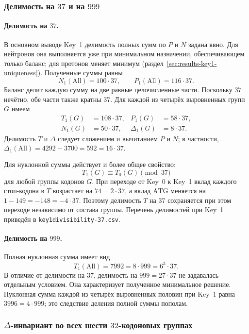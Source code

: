 \documentclass[11pt,a4paper]{article}
\renewcommand{\_}{\origunderscore\allowbreak}
\begin{document}
\subsubsection{Делимость на \texorpdfstring{$37$}{37} и на \texorpdfstring{$999$}{999}}
\label{sec:results-key1-divisibility37and999}

\paragraph{Делимость на $37$.}
В основном выводе Key~1 делимость полных сумм по $P$ и
$N$ задана явно. Для нейтронов она выполняется уже
при минимальном назначении, обеспечивающем только
баланс; для протонов меняет минимум
(раздел~\ref{sec:results-key1-uniqueness}).
Полученные суммы равны
\[
N_1(\mathrm{All})=100\cdot37,\qquad
P_1(\mathrm{All})=116\cdot37.
\]
Баланс делит каждую сумму на две равные целочисленные
части. Поскольку $37$ нечётно, обе части также кратны
$37$. Для каждой из четырёх выровненных групп $G$ имеем
\[
\begin{aligned}
T_1(G)&=108\cdot37, & P_1(G)&=58\cdot37,\\
N_1(G)&=50\cdot37, & \Delta_1(G)&=8\cdot37.
\end{aligned}
\]
Делимость $T$ и $\Delta$ следует сложением и вычитанием
$P$ и $N$; в частности,
$\Delta_1(\mathrm{All})=4292-3700=592=16\cdot37$.

Для нуклонной суммы действует и более общее свойство:
\[
T_1(G)\equiv T_0(G)\pmod{37}
\]
для любой группы кодонов $G$. При переходе от Key~0
к Key~1 вклад каждого стоп-кодона в $T$ возрастает
на $74=2\cdot37$, а вклад $\mathrm{ATG}$ меняется
на $1-149=-148=-4\cdot37$. Поэтому делимость $T$
на $37$ сохраняется при этом переходе независимо
от состава группы. Перечень делимостей при Key~1
приведён в \texttt{key1\_divisibility-37.csv}.

\paragraph{Делимость на $999$.}
Полная нуклонная сумма имеет вид
\[
T_1(\mathrm{All})=7992=8\cdot999=6^3\cdot37.
\]
В отличие от делимости на $37$, делимость на
$999=27\cdot37$ не задавалась отдельным условием.
Она характеризует полученное минимальное решение.
Нуклонная сумма каждой из четырёх выровненных половин
при Key~1 равна $3996=4\cdot999$; это следствие деления
полной суммы пополам.

\subsubsection{\texorpdfstring{$\Delta$}{Delta}-инвариант во всех шести $32$-кодоновых группах}
\label{sec:results-key1-deltainvariant}
\end{document}
